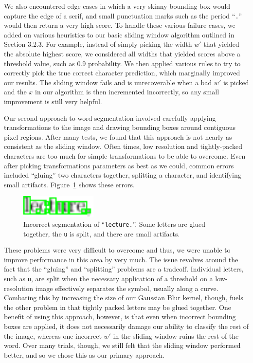 \documentclass[10pt]{IEEEtran}
\begin{document}
We also encountered edge cases in which a very skinny bounding box would capture the edge of a serif, and small punctuation marks such as the period ``\texttt{.}'' would then return a very high score. To handle these various failure cases, we added on various heuristics to our basic sliding window algorithm outlined in Section 3.2.3. For example, instead of simply picking the width $w'$ that yielded the absolute highest score, we considered all widths that yielded scores above a threshold value, such as $0.9$ probability. We then applied various rules to try to correctly pick the true correct character prediction, which marginally improved our results. The sliding window fails and is unrecoverable when a bad $w'$ is picked and the $x$ in our algorithm is then incremented incorrectly, so any small improvement is still very helpful.

Our second approach to word segmentation involved carefully applying transformations to the image and drawing bounding boxes around contiguous pixel regions. After many tests, we found that this approach is not nearly as consistent as the sliding window. Often times, low resolution and tightly-packed characters are too much for simple transformations to be able to overcome. Even after picking transformations parameters as best as we could, common errors included ``gluing'' two characters together, splitting a character, and identifying small artifacts. Figure~\ref{fig:wordBounds2} shows these errors.

\begin{figure}[h]
  \centering
    \includegraphics[width=1.5in]{word5-bounds.png}
  \caption{Incorrect segmentation of ``\texttt{lecture.}''. Some letters are glued together, the \texttt{u} is split, and there are small artifacts.}
  \label{fig:wordBounds2}
\end{figure}

These problems were very difficult to overcome and thus, we were unable to improve performance in this area by very much. The issue revolves around the fact that the ``gluing'' and ``splitting'' problems are a tradeoff. Individual letters, such as \texttt{u}, are split when the necessary application of a threshold on a low-resolution image effectively separates the symbol, usually along a curve. Combating this by increasing the size of our Gaussian Blur kernel, though, fuels the other problem in that tightly packed letters may be glued together. One benefit of using this approach, however, is that even when incorrect bounding boxes are applied, it does not necessarily damage our ability to classify the rest of the image, whereas one incorrect $w'$ in the sliding window ruins the rest of the word. Over many trials, though, we still felt that the sliding window  performed better, and so we chose this as our primary approach.
\end{document}
